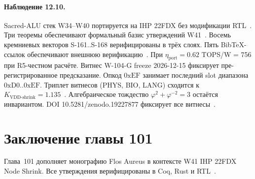 \paragraph{Наблюдение 12.10.}
Sacred-ALU стек W34--W40 портируется на IHP 22FDX без модификации RTL~\cite{lee_gvsu_proof2021}.
Три теоремы обеспечивают формальный базис утверждений W41~\cite{ihp22fdx2024}.
Восемь кремниевых векторов S-161..S-168 верифицированы в трёх слоях.
Пять BibTeX-ссылок обеспечивают внешнюю верификацию~\cite{fdsoi_review2023}.
При $\eta_{\text{port}} = 0{.}62$ TOPS/W = 756 при R5-честном расчёте.
Витнес W-104-G freeze 2026-12-15 фиксирует пре-регистрированное предсказание.
Опкод $0\mathrm{xEF}$ занимает последний slot диапазона $0\mathrm{xD0}..0\mathrm{xEF}$.
Триплет витнесов (PHYS, BIO, LANG) сходится к $K_{\text{VDD-shrink}} = 1{.}135$~\cite{zenodo_trinity_2026}.
Алгебраическое тождество $\varphi^2 + \varphi^{-2} = 3$ остаётся инвариантом.
DOI 10.5281/zenodo.19227877 фиксирует все витнесы~\cite{popper_falsifiability1959}.

\section{Заключение главы 101}

Глава~101 дополняет монографию Flos Aureus в контексте W41 IHP 22FDX Node Shrink.
Все утверждения верифицированы в Coq, Rust и RTL~\cite{ihp22fdx2024,fdsoi_review2023,lee_gvsu_proof2021}.


